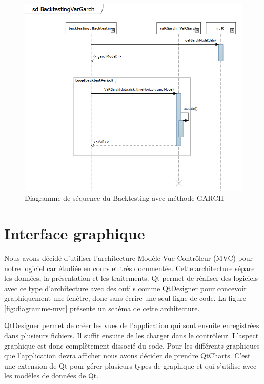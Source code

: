 \documentclass[a4paper]{report}
\begin{document}
\begin{figure}
	\center
	\includegraphics[scale=0.8]{diagramme_sequence_backtesting.png}
    \caption{Diagramme de séquence du Backtesting avec méthode GARCH}
    \label{fig:diagramme-sequence-backtesting-garch}
\end{figure}


\section{Interface graphique}

Nous avons décidé d’utiliser l'architecture Modèle-Vue-Contrôleur (MVC) pour notre logiciel car étudiée en cours et très documentée.
Cette architecture sépare les données, la présentation et les traitements.
Qt permet de réaliser des logiciels avec ce type d’architecture avec des outils comme QtDesigner pour concevoir graphiquement une fenêtre, donc sans écrire une seul ligne de code.
La figure \ref{fig:diagramme-mvc} présente un schéma de cette architecture.

QtDesigner permet de créer les vues de l’application qui sont ensuite enregistrées dans plusieurs fichiers.
Il suffit ensuite de les charger dans le contrôleur.
L'aspect graphique est donc complètement dissocié du code.
Pour les différents graphiques que l'application devra afficher nous avons décider de prendre QtCharts. C'est une extension de Qt pour gérer plusieurs types de graphique et qui s'utilise avec les modèles de données de Qt.
\end{document}
